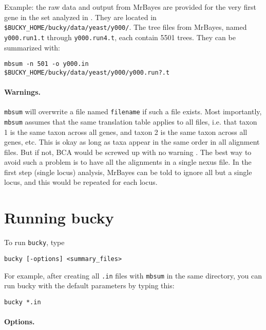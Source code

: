 \documentclass[12pt,english,final,letterpaper]{article}
\newcommand{\com}[1]{}
\begin{document}
\noindent
Example: the raw data and output from MrBayes are provided for the
very first gene in the set analyzed in \cite{ane-etal-2008}.
They are located in \verb+$BUCKY_HOME/bucky/data/yeast/y000/+. 
The tree files from MrBayes, named \verb+y000.run1.t+ through
\verb+y000.run4.t+, each contain 5501 trees. 
They can be summarized with:
\begin{verbatim}
mbsum -n 501 -o y000.in    $BUCKY_HOME/bucky/data/yeast/y000/y000.run?.t
\end{verbatim}

\paragraph{Warnings.}  
{\tt mbsum} will overwrite a file named \verb+filename+
if such a file exists.
Most importantly, \texttt{mbsum} assumes that the same 
translation table applies to all files, i.e. that taxon 1
is the same taxon across all genes, and taxon 2 is the same
taxon across all genes, etc. This is okay as long as taxa
appear in the same order in all alignment files. But if not, 
BCA would be screwed up with no warning
\citep{ane-etal-2008}.
The best way to avoid such a problem is to have all the 
alignments in a single nexus file. In the first step (single
locus) analysis, MrBayes can be told to ignore all but 
a single locus, and this would be repeated for each locus.
\com{This shortcoming will be fixed in a later version of \texttt{mbsum}.}

\section{Running bucky}
To run {\tt bucky}, type
\begin{verbatim}
bucky [-options] <summary_files> 
\end{verbatim}
For example, after creating all {\tt .in} files with {\tt mbsum} in the same 
directory, you can run bucky with the default parameters by typing this:
\begin{verbatim}
bucky *.in
\end{verbatim}

\paragraph{Options.} \hspace{1cm}
\end{document}
